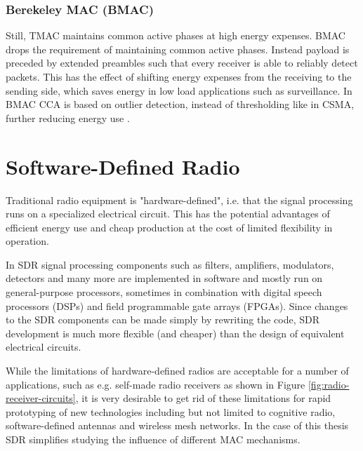 \subsubsection{Berekeley MAC (BMAC)}

Still, TMAC maintains common active phases at high energy expenses. BMAC drops the requirement of maintaining common active phases. Instead payload is preceded by extended preambles such that every receiver is able to reliably detect packets. This has the effect of shifting energy expenses from the receiving to the sending side, which saves energy in low load applications such as surveillance. In BMAC CCA is based on outlier detection, instead of thresholding like in CSMA, further reducing energy use \cite{Polastre04}. 

\section{Software-Defined Radio}
 
Traditional radio equipment is "hardware-defined", i.e. that the signal processing runs on a specialized electrical circuit. This has the potential advantages of efficient energy use and cheap production at the cost of limited flexibility in operation. 

In SDR signal processing components such as filters, amplifiers, modulators, detectors and many more are implemented in software and mostly run on general-purpose processors, sometimes in combination with digital speech processors (DSPs) and field programmable gate arrays (FPGAs). Since changes to the SDR components can be made simply by rewriting the code, SDR development is much more flexible (and cheaper) than the design of equivalent electrical circuits.

While the limitations of hardware-defined radios are acceptable for a number of applications, such as e.g. self-made radio receivers as shown in Figure \ref{fig:radio-receiver-circuits}, it is very desirable to get rid of these limitations for rapid prototyping of new technologies including but not limited to cognitive radio, software-defined antennas and wireless mesh networks. In the case of this thesis SDR simplifies studying the influence of different MAC mechanisms.

